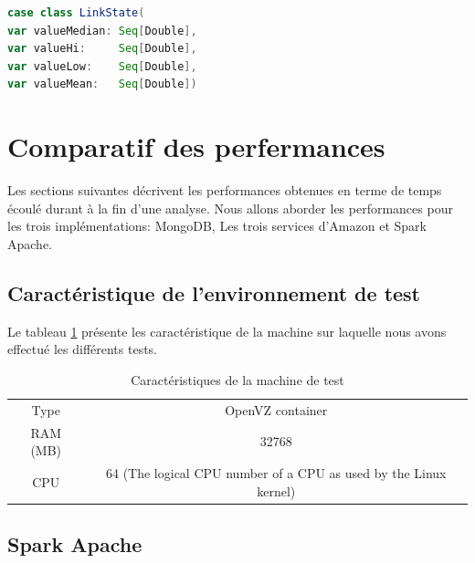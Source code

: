   

\begin{lstlisting}[language=scala, caption={La classe LinkState en Scala }]
case class LinkState(
var valueMedian: Seq[Double],
var valueHi:     Seq[Double],
var valueLow:    Seq[Double],
var valueMean:   Seq[Double])
\end{lstlisting}

\section{Comparatif des perfermances}

Les sections suivantes décrivent les performances obtenues en terme de temps écoulé durant à la fin d'une analyse.  Nous allons aborder les performances pour les trois implémentations: MongoDB, Les trois services d'Amazon et  Spark Apache.


\subsection{Caractéristique de l'environnement de test}

Le tableau \ref{tab:test-machine} présente les caractéristique de la machine sur laquelle nous avons effectué les différents tests. 
\begin{table}
	\begin{tabular}{cc}
		Type& OpenVZ container\\
		RAM (MB)& 32768 \\
		CPU & 64 (The logical CPU number of a CPU as used by the Linux kernel) \\
	\end{tabular}
	\caption{Caractéristiques de la machine de test}
	\label{tab:test-machine}
\end{table}

\subsection{Spark Apache}



